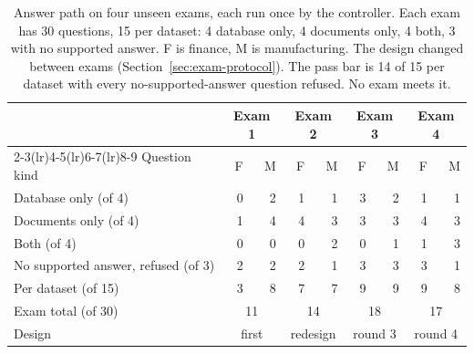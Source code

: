 \begin{table}[H]
\centering\small
\caption{Answer path on four unseen exams, each run once by the controller. Each exam has 30 questions, 15 per dataset: 4 database only, 4 documents only, 4 both, 3 with no supported answer. F is finance, M is manufacturing. The design changed between exams (Section~\ref{sec:exam-protocol}). The pass bar is 14 of 15 per dataset with every no-supported-answer question refused. No exam meets it.}
\label{tab:exam-heldout}
\begin{tabular}{lrrrrrrrr}
\toprule
 & \multicolumn{2}{c}{Exam 1} & \multicolumn{2}{c}{Exam 2} & \multicolumn{2}{c}{Exam 3} & \multicolumn{2}{c}{Exam 4}\\
\cmidrule(lr){2-3}\cmidrule(lr){4-5}\cmidrule(lr){6-7}\cmidrule(lr){8-9}
Question kind & F & M & F & M & F & M & F & M\\\midrule
Database only (of 4) & 0 & 2 & 1 & 1 & 3 & 2 & 1 & 1\\
Documents only (of 4) & 1 & 4 & 4 & 3 & 3 & 3 & 4 & 3\\
Both (of 4) & 0 & 0 & 0 & 2 & 0 & 1 & 1 & 3\\
No supported answer, refused (of 3) & 2 & 2 & 2 & 1 & 3 & 3 & 3 & 1\\\midrule
Per dataset (of 15) & 3 & 8 & 7 & 7 & 9 & 9 & 9 & 8\\
Exam total (of 30) & \multicolumn{2}{c}{11} & \multicolumn{2}{c}{14} & \multicolumn{2}{c}{18} & \multicolumn{2}{c}{17}\\
Design & \multicolumn{2}{c}{first} & \multicolumn{2}{c}{redesign} & \multicolumn{2}{c}{round 3} & \multicolumn{2}{c}{round 4}\\
\bottomrule
\end{tabular}
\end{table}

